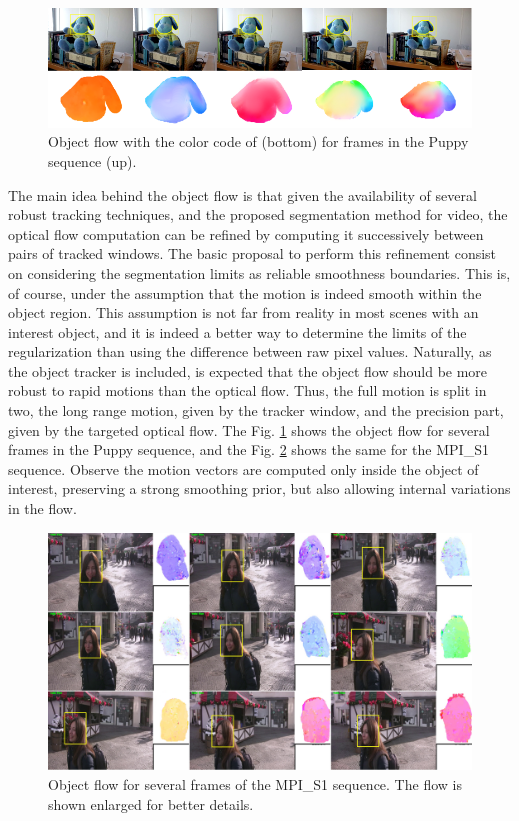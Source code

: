    \begin{figure}[thpb]
      \centering
      \includegraphics[width=1.0\textwidth]{../images/objectflow.png}
      \caption{Object flow with the color code of \cite{c17} (bottom) for frames in the Puppy sequence (up). }
      \label{of}
   \end{figure}

The main idea behind the object flow is that given the availability of several robust tracking techniques, and the proposed
segmentation method for video, the optical flow computation can be refined by computing it successively between pairs
of tracked windows. The basic proposal to perform this refinement consist on considering the segmentation limits  as reliable smoothness boundaries. 
This is, of course, under the assumption that the motion is indeed smooth within the object region. 
This  assumption is not far from reality in most scenes with an interest object, and it is indeed a better way to determine the limits of the regularization 
than using the difference between raw pixel values.
Naturally, as the object tracker is included, is expected that the object flow should be more robust to rapid motions than the
optical flow. 
Thus, the full motion is split in two, the long range motion, given by the tracker window, and the precision part, given by the targeted optical flow. The Fig. \ref{of} shows 
the object flow for several frames in the Puppy sequence, and the Fig. \ref{of2} shows the same for the MPI\_S1 sequence. Observe the motion vectors are computed 
only inside the object of interest, preserving a strong smoothing prior, but 
also allowing internal variations in the flow. 

   \begin{figure}[thpb]
      \centering
      \includegraphics[width=1.0\textwidth]{../images/other_of.png}
      \caption{ Object flow for several frames of the MPI\_S1 sequence. The flow is shown enlarged for better details.}
      \label{of2}
   \end{figure}

